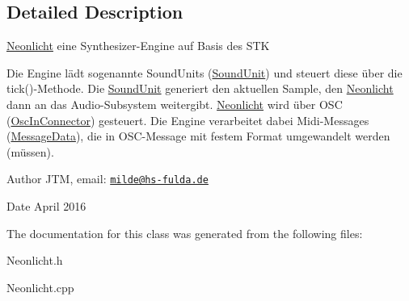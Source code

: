 \subsection{Detailed Description}
\hyperlink{classNeonlicht}{Neonlicht} eine Synthesizer-\/\+Engine auf Basis des S\+TK

Die Engine lädt sogenannte Sound\+Units (\hyperlink{classSoundUnit}{Sound\+Unit}) und steuert diese über die tick()-\/\+Methode. Die \hyperlink{classSoundUnit}{Sound\+Unit} generiert den aktuellen Sample, den \hyperlink{classNeonlicht}{Neonlicht} dann an das Audio-\/\+Subsystem weitergibt. \hyperlink{classNeonlicht}{Neonlicht} wird über O\+SC (\hyperlink{classOscInConnector}{Osc\+In\+Connector}) gesteuert. Die Engine verarbeitet dabei Midi-\/\+Messages (\hyperlink{classMessageData}{Message\+Data}), die in O\+S\+C-\/\+Message mit festem Format umgewandelt werden (müssen).

\begin{DoxyAuthor}{Author}
J\+TM,  email\+: \href{mailto:milde@hs-fulda.de}{\tt milde@hs-\/fulda.\+de} 
\end{DoxyAuthor}
\begin{DoxyDate}{Date}
April 2016 
\end{DoxyDate}


The documentation for this class was generated from the following files\+:\begin{DoxyCompactItemize}
\item 
Neonlicht.\+h\item 
Neonlicht.\+cpp\end{DoxyCompactItemize}
